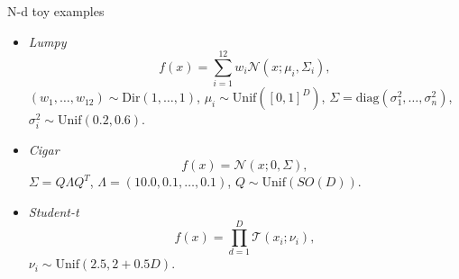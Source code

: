 \documentclass{beamer}
\begin{document}
\begin{frame}
\begin{block}{N-d toy examples}
\begin{itemize}
	\item \textit{Lumpy}
	\begin{equation*}
	f(x) = \sum_{i=1}^{12} w_i \mathcal{N}(x;\mu_i,\Sigma_i),
	\end{equation*}
	$(w_1,\ldots,w_{12}) \sim \text{Dir}(1,\ldots,1)$, $\mu_i \sim \text{Unif}([0,1]^D)$, $\Sigma = \text{diag}(\sigma_1^2,\ldots,\sigma_n^2)$, $\sigma_i^2 \sim \text{Unif}(0.2,0.6)$.
	
	\item \textit{Cigar}
	\begin{equation*}
	f(x) = \mathcal{N}(x;0,\Sigma),
	\end{equation*}
	$\Sigma = Q \Lambda Q^T$, $\Lambda = (10.0,0.1,\ldots,0.1)$, $Q \sim \text{Unif}(SO(D))$.
	
	\item \textit{Student-t} 
	\begin{equation*}
	f(x) =  \prod_{d=1}^D \mathcal{T}(x_i;\nu_i),
	\end{equation*}
	$\nu_i \sim \text{Unif}(2.5,2+0.5D)$.
\end{itemize}
\end{block}
\end{frame}
\end{document}
